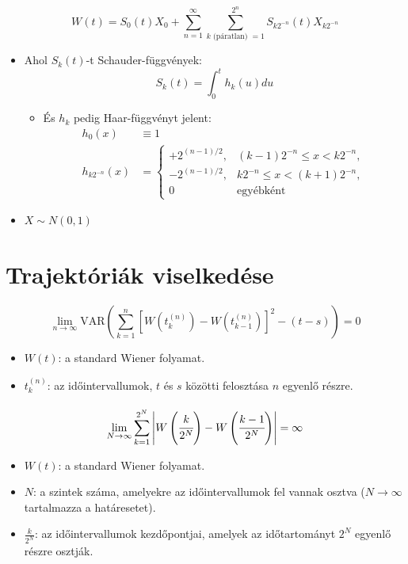 \documentclass[11pt,a4paper]{article}
\begin{document}
					\paragraph{}
						$$W(t) = S_0(t)X_0 + \sum_{n=1}^{\infty} \sum_{k \text{ (páratlan) }=1 }^{2^{n}}S_{k2^{-n}}(t)X_{k2^{-n}}$$
						\begin{itemize}
							  \item Ahol $S_k(t)$-t Schauder-függvények:
							  $$S_k(t) = \int_{0}^t h_k(u)du$$
							    \begin{itemize}
							      \item És $h_k$ pedig Haar-függvényt jelent:
							      $$\begin{aligned}
							         h_0(x) & \equiv 1 \\
							         h_{k 2^{-n}}(x) & = \begin{cases}
							             +2^{(n-1)/2}, & (k-1)2^{-n} \le x < k2^{-n}, \\
							             -2^{(n-1)/2}, & k2^{-n} \le x < (k+1)2^{-n}, \\
							             0 & \text{egyébként}
							         \end{cases}
							       \end{aligned}$$
							    \end{itemize}
							  \item $X \sim N(0,1)$
						\end{itemize}	
			\section[Wiener-folyamat trajektóriáinak viselkedése]{Trajektóriák viselkedése}
				\paragraph{}
					$$
					\lim_{n \to \infty} \text{VAR} \left( \sum_{k=1}^{n} \left[ W\left(t_k^{(n)}\right) - W\left(t_{k-1}^{(n)}\right) \right]^2 - (t-s) \right) = 0
					$$
					\begin{itemize}
						\item $W(t)$: a standard Wiener folyamat.
						\item $t_k^{(n)}$: az időintervallumok, $t$ és $s$ közötti felosztása $n$ egyenlő részre.
					\end{itemize}
				\paragraph{}
					$$\lim_{N \to \infty} \sum_{k=1}^{2^N}\left| W \left( \cfrac{k}{2^N}\right) - W \left( \cfrac{k-1}{2^N}\right) \right| = \infty$$
					\begin{itemize}
						\item $W(t)$: a standard Wiener folyamat.
						\item $N$: a szintek száma, amelyekre az időintervallumok fel vannak osztva ($N \to \infty$ tartalmazza a határesetet).
						\item $\frac{k}{2^N}$: az időintervallumok kezdőpontjai, amelyek az időtartományt $2^N$ egyenlő részre osztják.
					\end{itemize}
\end{document}
